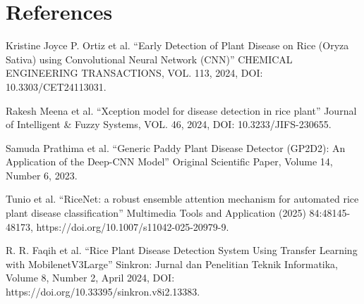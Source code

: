 \documentclass[11pt,a4paper]{article}
\begin{document}
\section*{References}
\begin{enumerate}[label={[\arabic*]}]
    \item Kristine Joyce P. Ortiz et al. ``Early Detection of Plant Disease on Rice (Oryza Sativa) using Convolutional Neural Network (CNN)'' CHEMICAL ENGINEERING TRANSACTIONS, VOL. 113, 2024, DOI: 10.3303/CET24113031.
    \item Rakesh Meena et al. ``Xception model for disease detection in rice plant'' Journal of Intelligent \& Fuzzy Systems, VOL. 46, 2024, DOI: 10.3233/JIFS-230655.
    \item Samuda Prathima et al. ``Generic Paddy Plant Disease Detector (GP2D2): An Application of the Deep-CNN Model'' Original Scientific Paper, Volume 14, Number 6, 2023.
    \item Tunio et al. ``RiceNet: a robust ensemble attention mechanism for automated rice plant disease classification'' Multimedia Tools and Application (2025) 84:48145-48173, https://doi.org/10.1007/s11042-025-20979-9.
    \item R. R. Faqih et al. ``Rice Plant Disease Detection System Using Transfer Learning with MobilenetV3Large'' Sinkron: Jurnal dan Penelitian Teknik Informatika, Volume 8, Number 2, April 2024, DOI: https://doi.org/10.33395/sinkron.v8i2.13383.
\end{enumerate}
\end{document}
